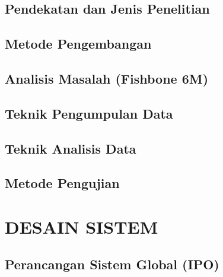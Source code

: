 \documentclass[12pt,a4paper,oneside,openany]{report}
\begin{document}
\subsection{Pendekatan dan Jenis Penelitian}
\label{subsec:pendekatan-penelitian}

\subsection{Metode Pengembangan}
\label{subsec:metode-pengembangan}

\subsection{Analisis Masalah (Fishbone 6M)}
\label{subsec:analisis-masalah}

\subsection{Teknik Pengumpulan Data}
\label{subsec:teknik-pengumpulan-data}

\subsection{Teknik Analisis Data}
\label{subsec:teknik-analisis-data}

\subsection{Metode Pengujian}
\label{subsec:metode-pengujian}

\section{DESAIN SISTEM}
\label{sec:desain-sistem}

\subsection{Perancangan Sistem Global (IPO)}
\label{subsec:sistem-global}
\end{document}

